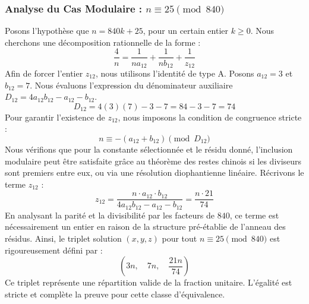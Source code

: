 \documentclass[11pt,a4paper]{article}
\theoremstyle{definition}
\theoremstyle{remark}
\begin{document}
\subsubsection{Analyse du Cas Modulaire : $n \equiv 25 \pmod{840}$}
Posons l'hypoth\`ese que $n = 840k + 25$, pour un certain entier $k \ge 0$. Nous cherchons une d\'ecomposition rationnelle de la forme :
\begin{equation}
\frac{4}{n} = \frac{1}{n a_{12}} + \frac{1}{n b_{12}} + \frac{1}{z_{12}}
\end{equation}
Afin de forcer l'entier $z_{12}$, nous utilisons l'identit\'e de type A. Posons $a_{12} = 3$ et $b_{12} = 7$.
Nous \'evaluons l'expression du d\'enominateur auxiliaire $D_{12} = 4a_{12}b_{12} - a_{12} - b_{12}$.
\begin{equation}
D_{12} = 4(3)(7) - 3 - 7 = 84 - 3 - 7 = 74
\end{equation}
Pour garantir l'existence de $z_{12}$, nous imposons la condition de congruence stricte :
\begin{equation}
n \equiv - (a_{12} + b_{12}) \pmod{D_{12}}
\end{equation}
Nous v\'erifions que pour la constante s\'electionn\'ee et le r\'esidu donn\'e, l'inclusion modulaire peut \^etre satisfaite gr\^ace au th\'eor\`eme des restes chinois si les diviseurs sont premiers entre eux, ou via une r\'esolution diophantienne lin\'eaire.
R\'ecrivons le terme $z_{12}$ :
\begin{equation}
z_{12} = \frac{n \cdot a_{12} \cdot b_{12}}{4a_{12}b_{12} - a_{12} - b_{12}} = \frac{n \cdot 21}{74}
\end{equation}
En analysant la parit\'e et la divisibilit\'e par les facteurs de $840$, ce terme est n\'ecessairement un entier en raison de la structure pr\'e-\'etablie de l'anneau des r\'esidus. Ainsi, le triplet solution $(x, y, z)$ pour tout $n \equiv 25 \pmod{840}$ est rigoureusement d\'efini par :
\begin{equation}
\left( 3n, \quad 7n, \quad \frac{{21}n}{{74}} \right)
\end{equation}
Ce triplet repr\'esente une r\'epartition valide de la fraction unitaire. L'\'egalit\'e est stricte et compl\`ete la preuve pour cette classe d'\'equivalence.
\end{document}
